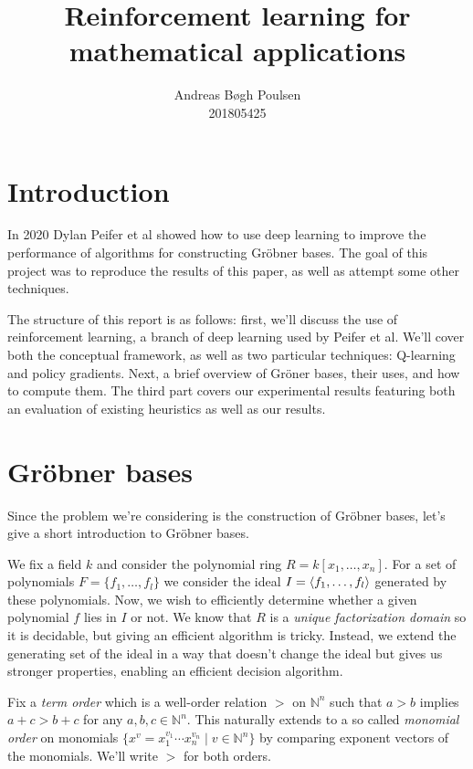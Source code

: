 \documentclass{article}
\title{Reinforcement learning for mathematical applications}
\author{
    Andreas Bøgh Poulsen\\
    201805425
}
\theoremstyle{changedot}
\theoremstyle{changedotbreak}
\theoremstyle{nonumberplain}
\DeclarePairedDelimiter{\tuple}{\langle}{\rangle}
\begin{document}
\maketitle

\section{Introduction}
In 2020 Dylan Peifer et al\cite{peifer} showed how to use deep learning to improve the performance of algorithms for constructing Gröbner bases. The goal of this project was to reproduce the results of this paper, as well as attempt some other techniques.

The structure of this report is as follows: first, we'll discuss the use of reinforcement learning, a branch of deep learning used by Peifer et al. We'll cover both the conceptual framework, as well as two particular techniques: Q-learning and policy gradients. Next, a brief overview of Gröner bases, their uses, and how to compute them. The third part covers our experimental results featuring both an evaluation of existing heuristics as well as our results.

\section{Gröbner bases}

Since the problem we're considering is the construction of Gröbner bases, let's give a short introduction to Gröbner bases.

We fix a field $k$ and consider the polynomial ring $R = k[x_{1}, \dots, x_{n}]$. For a set of polynomials $F = \{f_{1}, \dots, f_{l}\}$ we consider the ideal $I = \tuple{f_{1}, \dots, f_{l}}$ generated by these polynomials. Now, we wish to efficiently determine whether a given polynomial $f$ lies in $I$ or not. We know that $R$ is a \emph{unique factorization domain} so it is decidable, but giving an efficient algorithm is tricky. Instead, we extend the generating set of the ideal in a way that doesn't change the ideal but gives us stronger properties, enabling an efficient decision algorithm.

Fix a \emph{term order} which is a well-order relation $>$ on $\mathbb N^{n}$ such that $a > b$ implies $a + c > b + c$ for any $a, b, c \in \mathbb N^{n}$. This naturally extends to a so called \emph{monomial order} on monomials $\{x^{v} = x_{1}^{v_{1}} \cdots x_{n}^{v_{n}} \mid v \in \mathbb N^{n}\}$ by comparing exponent vectors of the monomials. We'll write $>$ for both orders.
\end{document}
